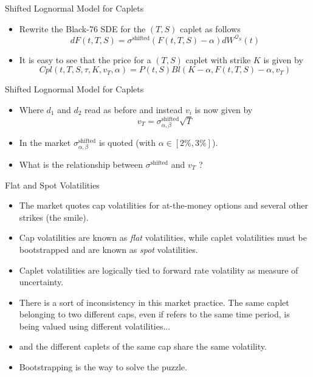 \documentclass{beamer}
\begin{document}
\begin{frame}{Shifted Lognormal Model for Caplets}
	\begin{itemize}
		\item Rewrite the Black-76 SDE for the $(T, S)$ caplet as follows
		\begin{equation}
			dF(t,T,S)=\sigma^{\text{shifted}}(F(t,T,S)-\alpha)dW^{\mathcal{Q}_S}(t)
		\end{equation}
		\item It is easy to see that the price for a $(T,S)$ caplet with strike $K$ is given by
		\begin{equation}
			Cpl(t,T,S,\tau,K,v_T,\alpha)=P(t,S)Bl(K-\alpha,F(t,T,S)-\alpha,v_T)
		\end{equation}
	\end{itemize}
\end{frame}

\begin{frame}{Shifted Lognormal Model for Caplets}
	\begin{itemize}
		\item Where $d_1$ and $d_2$ read as before and instead $v_i$ is now given by
		\begin{equation}
			v_T = \sigma^{\text{shifted}}_{\alpha,\beta}\sqrt{T}
		\end{equation}
		\item In the market $\sigma^{\text{shifted}}_{\alpha,\beta}$ is quoted (with $\alpha \in [2\%,3\%]$).
		\item What is the relationship between $\sigma^{\text{shifted}}$ and $v_T$ ?
	\end{itemize}
\end{frame}

\begin{frame}{Flat and Spot Volatilities}
	\begin{itemize}
		\item The market quotes cap volatilities for at-the-money options and several other strikes (the smile).
		\item Cap volatilities are known as \emph{flat} volatilities, while caplet volatilities must be bootstrapped and are known as \emph{spot} volatilities.
		\item Caplet volatilities are logically tied to forward rate volatility as measure of uncertainty.
		\item There is a sort of inconsistency in this market practice. The same caplet belonging to two different caps, even if refers to the same time period, is being valued using different volatilities...
		\item and the different caplets of the same cap share the same volatility.
		\item Bootstrapping is the way to solve the puzzle.
	\end{itemize}
\end{frame}
\end{document}
